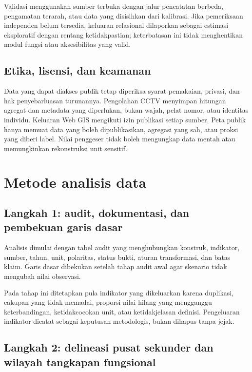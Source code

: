 \documentclass[11pt,a4paper,oneside,openany,indonesian]{report}
\begin{document}
Validasi menggunakan sumber terbuka dengan jalur pencatatan berbeda,
pengamatan terarah, atau data yang disisihkan dari kalibrasi. Jika
pemeriksaan independen belum tersedia, keluaran relasional dilaporkan
sebagai estimasi eksploratif dengan rentang ketidakpastian; keterbatasan
ini tidak menghentikan modul fungsi atau aksesibilitas yang valid.

\subsection{Etika, lisensi, dan
keamanan}\label{etika-lisensi-dan-keamanan}

Data yang dapat diakses publik tetap diperiksa syarat pemakaian,
privasi, dan hak penyebarluasan turunannya. Pengolahan CCTV menyimpan
hitungan agregat dan metadata yang diperlukan, bukan wajah, pelat nomor,
atau identitas individu. Keluaran Web GIS mengikuti izin publikasi setiap sumber. Peta publik hanya memuat
data yang boleh dipublikasikan, agregasi yang sah, atau proksi yang
diberi label. Nilai penggeser tidak boleh mengungkap data mentah atau
memungkinkan rekonstruksi unit sensitif.

\section{Metode analisis data}\label{metode-analisis-data}

\subsection{Langkah 1: audit, dokumentasi, dan pembekuan garis
dasar}\label{langkah-1-audit-dokumentasi-dan-pembekuan-garis-dasar}

Analisis dimulai dengan tabel audit yang menghubungkan konstruk,
indikator, sumber, tahun, unit, polaritas, status bukti, aturan
transformasi, dan batas klaim. Garis dasar dibekukan setelah tahap audit
awal agar skenario tidak mengubah nilai observasi.

Pada tahap ini ditetapkan pula indikator yang dikeluarkan karena
duplikasi, cakupan yang tidak memadai, proporsi nilai hilang yang
mengganggu keterbandingan, ketidakcocokan unit, atau ketidakjelasan
definisi. Pengeluaran indikator dicatat sebagai keputusan metodologis,
bukan dihapus tanpa jejak.

\subsection{Langkah 2: delineasi pusat sekunder dan wilayah
tangkapan
fungsional}\label{langkah-2-delineasi-pusat-sekunder-dan-wilayah-tangkapan-fungsional}
\end{document}
